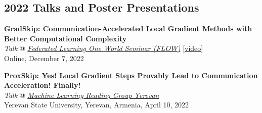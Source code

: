 \documentclass[11pt,a4paper,sans]{moderncv}        %
\begin{document}
\subsection{2022 Talks and Poster Presentations}
\begin{etaremune}[resume]
\item \textbf{GradSkip: Communication-Accelerated Local Gradient Methods with Better Computational Complexity}\\
\textit{Talk} @ \textcolor{accent}{\href{https://sites.google.com/view/one-world-seminar-series-flow/archive/2022?authuser=0\#h.99nho9x1b8ju}{\textit{Federated Learning One World Seminar (FLOW)}}} [\textcolor{orange}{\href{https://youtu.be/WWhY5tO-FiM}{video}}]\\
Online, December 7, 2022

\item \textbf{ProxSkip: Yes! Local Gradient Steps Provably Lead to Communication Acceleration! Finally!}\\
\textit{Talk} @ \textcolor{accent}{\href{https://groups.google.com/g/ml-reading-group-yerevan/c/-TZmYEWATuI}{\textit{Machine Learning Reading Group Yerevan}}}\\
Yerevan State University, Yerevan, Armenia, April 10, 2022
\end{etaremune}



\end{document}
